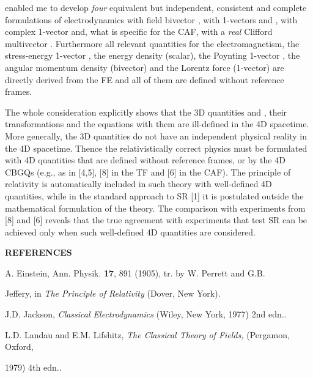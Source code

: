 \documentclass[a4paper,showpacs,preprintnumbers,amsmath,amssymb]{revtex4}
\begin{document}
enabled me to develop \emph{four} equivalent but independent, consistent and
complete formulations of electrodynamics with field bivector \coordHE{}, with
1-vectors \coordHE{} and \coordHE{} , with complex 1-vector \myHighlight{$\Psi $}\coordHE{} and, what is specific
for the CAF, with a \emph{real }Clifford multivector \myHighlight{$\Psi $}\coordHE{}. Furthermore
all relevant quantities for the electromagnetism, the stress-energy 1-vector
\coordHE{}, the energy density \coordHE{} (scalar), the Poynting 1-vector \coordHE{}, the
angular momentum density \coordHE{} (bivector) and the Lorentz force \coordHE{} (1-vector)
are directly derived from the FE and all of them are defined without
reference frames.

The whole consideration explicitly shows that the 3D quantities \coordHE{}
and \coordHE{}, their transformations and the equations with them are
ill-defined in the 4D spacetime. More generally, the 3D quantities do not
have an independent physical reality in the 4D spacetime. Thence the
relativistically correct physics must be formulated with 4D quantities that
are defined without reference frames, or by the 4D CBGQs (e.g., as in [4,5],
[8] in the TF and [6] in the CAF). The principle of relativity is
automatically included in such theory with well-defined 4D quantities, while
in the standard approach to SR [1] it is postulated outside the mathematical
formulation of the theory. The comparison with experiments from [8] and [6]
reveals that the true agreement with experiments that test SR can be
achieved only when such well-defined 4D quantities are considered.\bigskip

\noindent \textbf{REFERENCES}\bigskip

\noindent \myHighlight{$\left[ 1\right] $}\coordHE{} A. Einstein, Ann. Physik. \textbf{17}, 891
(1905), tr. by W. Perrett and G.B.

Jeffery, in \textit{The Principle of Relativity} (Dover, New York).

\noindent \myHighlight{$\left[ 2\right] $}\coordHE{} J.D. Jackson, \textit{Classical Electrodynamics}
(Wiley, New York, 1977) 2nd edn..

\noindent \myHighlight{$\left[ 3\right] $}\coordHE{} L.D. Landau and E.M. Lifshitz, \textit{The
Classical Theory of Fields,} (Pergamon, Oxford,

1979) 4th edn..
\end{document}
